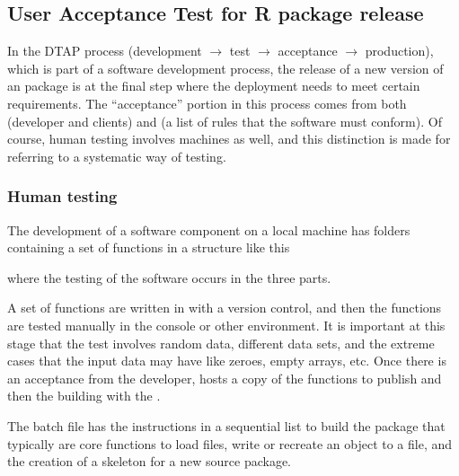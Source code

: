 \documentclass[a4paper,12pt,english]{sphinxhowto}
\begin{document}
\subsection{User Acceptance Test for R package release}
\label{\detokenize{UAT:user-acceptance-test-for-r-package-release}}
In the DTAP process (development \(\to\) test \(\to\) acceptance \(\to\) production),
which is part of a software development process, the release of a new
version of an  package is at the final
step where the deployment needs to meet certain requirements. The
“acceptance” portion in this process comes from both 
(developer and clients) and  (a list of rules that the
software must conform). Of course, human testing involves machines as
well, and this distinction is made for referring to a systematic way of
testing.



\subsubsection{Human testing}
\label{\detokenize{UAT:human-testing}}
The development of a software component on a local machine has folders
containing a set of functions in a structure like this

\begin{sphinxVerbatim}[commandchars=\\\{\},formatcom=\footnotesize]
   
\end{sphinxVerbatim}

where the testing of the software occurs in the three parts.

A set of  functions are written in
 with a version control, and then the functions are tested
manually in the  console or other
environment. It is important at this stage that the test involves random
data, different data sets, and the extreme cases that the input data may
have like zeroes, empty arrays, etc. Once there is an acceptance from the
developer,  hosts a copy of the functions to publish and then
the building with the .

The batch file has the instructions in a sequential list to build the
package that typically are  core functions to load files, write or
recreate an object to a file, and the creation of a skeleton for a new
source package.
\end{document}
